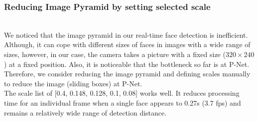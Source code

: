 \subsubsection{Reducing Image Pyramid by setting selected scale}\\

We noticed that the image pyramid in our real-time face detection is inefficient. Although, it can cope with different sizes of faces in images with a wide range of sizes, however, in our case, the camera takes a picture with a fixed size ($320\times240$) at a fixed position. Also, it is noticeable that the bottleneck so far is at P-Net. Therefore, we consider reducing the image pyramid and defining scales manually to reduce the image (sliding boxes) at P-Net.\\[.2in]
The scale list of [0.4, 0.148, 0.128, 0.1, 0.08] works well. It reduces processing time for an individual frame when a single face appears to 0.27s (3.7 fps) and remains a relatively wide range of detection distance.

